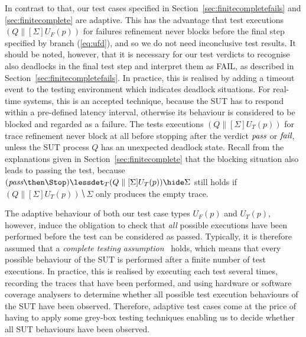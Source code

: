 In contrast to that, our test cases specified in
Section~\ref{sec:finitecompletefails} and \ref{sec:finitecomplete} are
adaptive. This has the advantage that test executions $(Q\parallel[\Sigma]
U_F(p))$ for failures refinement never blocks before the final step specified
by branch (\ref{eq:ufd}), and so we do not need inconclusive test results.
 It should be noted, however, that it is
necessary for our test verdicts to recognise also deadlocks in the final test
step and interpret them as FAIL, as described in
Section~\ref{sec:finitecompletefails}. In practice, this is realised by
adding a timeout event to the testing environment which indicates deadlock
situations. For real-time systems, this is an accepted technique, because the
SUT has to respond within a pre-defined latency interval, otherwise its
behaviour is considered to be blocked and regarded as a failure.
The tests executions $(Q\parallel[\Sigma] U_T(p))$ 
for trace refinement never
block at all before stopping after the verdict ${\text{\it pass}}$ or ${\text{\it fail}}$, unless the
SUT process $Q$ has an unexpected deadlock state. 
Recall from the explanations given in Section~\ref{sec:finitecomplete} that the 
blocking situation also leads to passing the test, because 
$(\epass\then \Stop)\lessdet_T (Q\parallel[\Sigma] U_T(p))\hide\Sigma$ still holds
if $(Q\parallel[\Sigma] U_T(p))\hide\Sigma$ only produces the empty trace.

The adaptive behaviour of both our test case types $U_F(p)$ and $U_T(p)$,
however, induce the obligation to check that {\it all}
possible executions have been
performed before the test can be considered as passed. Typically, it is
therefore assumed that a \emph{complete testing
assumption}~\cite{hierons_testing_2004}  holds, which means that every possible
behaviour of the SUT is performed after a finite number of test executions.
In practice, this is realised by executing each test several times, recording
the traces that have been performed, and using hardware or software coverage
analysers to determine whether all possible test execution behaviours of the
SUT have been observed. Therefore, adaptive test cases come at the price of
having to apply some grey-box testing techniques enabling us to decide
whether all SUT behaviours have been observed.

